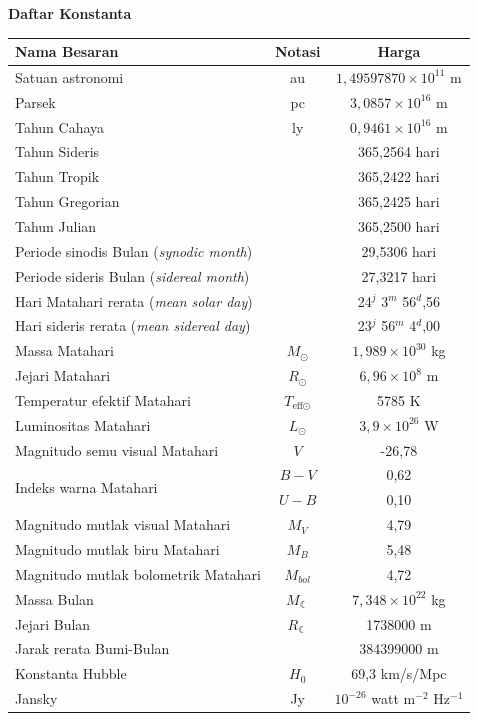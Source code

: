 \documentclass[11pt,fleqn, a4paper]{exam}
\begin{document}
\newpage
\center \textbf{Daftar Konstanta}

\begin{table}[ht]
\centering
\label{tab:konstanta01}
\renewcommand{\arraystretch}{1.3}
\begin{tabular}{|l|c|c|}
\hline
\textbf{Nama Besaran} & \textbf{Notasi} & \textbf{Harga}\\
\hline
\hline
Satuan astronomi & au & $1,49597870 \times 10^{11}$ m\\
\hline
Parsek & pc & $3,0857 \times 10^{16}$ m\\
\hline
Tahun Cahaya & ly & $0,9461 \times 10^{16}$ m\\
\hline
Tahun Sideris &  & 365,2564 hari\\
\hline
Tahun Tropik &  & 365,2422 hari\\
\hline
Tahun Gregorian &  & 365,2425 hari\\
\hline
Tahun Julian &  & 365,2500 hari\\
\hline
Periode sinodis Bulan (\textit{synodic month}) &  & 29,5306 hari\\
\hline
Periode sideris Bulan (\textit{sidereal month}) &  & 27,3217 hari\\
\hline
Hari Matahari rerata (\textit{mean solar day}) &  & 24$^{j}$ 3$^{m}$ 56$^{d}$,56\\
\hline
Hari sideris rerata (\textit{mean sidereal day}) &  & 23$^{j}$ 56$^{m}$ 4$^{d}$,00\\
\hline
Massa Matahari & $M_{\odot}$ & $1,989 \times 10^{30}$ kg\\
\hline
Jejari Matahari & $R_{\odot}$ & $6,96 \times 10^{8}$ m\\
\hline
Temperatur efektif Matahari & $T_{\text{eff} \odot}$ & 5785 K\\
\hline
Luminositas Matahari & $L_{\odot}$ & $3,9 \times 10^{26}$ W\\
\hline
Magnitudo semu visual Matahari & $V$ & -26,78\\
\hline
\multirow{2}{*}{Indeks warna Matahari} & $B - V$ & 0,62\\ \cline{2-3}
                                       & $U - B$ & 0,10\\
\hline
Magnitudo mutlak visual Matahari & $M_{V}$ & 4,79\\
\hline
Magnitudo mutlak biru Matahari & $M_{B}$ & 5,48\\
\hline
Magnitudo mutlak bolometrik Matahari & $M_{bol}$ & 4,72\\
\hline
Massa Bulan & $M_{\leftmoon}$ & $7,348 \times 10^{22}$ kg\\
\hline
Jejari Bulan & $R_{\leftmoon}$ & 1738000 m\\
\hline
Jarak rerata Bumi-Bulan & & 384399000 m\\
\hline
Konstanta Hubble & $H_{0}$ & 69,3 km/s/Mpc\\
\hline
Jansky & Jy & $10^{-26}$ watt m$^{-2}$ Hz$^{-1}$\\
\hline
\end{tabular} 
\end{table}
\end{document}

